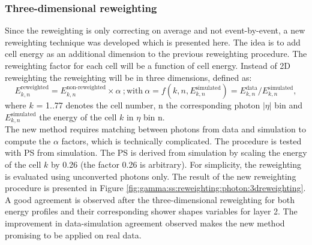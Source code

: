 \label{tab:avg}


\subsubsection{Three-dimensional reweighting}
Since the reweighting is only correcting on average and not event-by-event, a new reweighting technique was developed which is presented here. The idea is to add cell energy as an additional dimension to the previous reweighting procedure. The reweighting factor for each cell will be a function of cell energy. Instead of 2D reweighting the reweighting will be in three dimensions, defined as:
\begin{equation}
    E_{k,n}^{\text{reweighted}} = E_{k,n}^{\text{non-reweighted}} \times \alpha \ ; \text{with} \ \alpha = f(k,n,E_{k,n}^{\text{simulated}}) = E_{k,n}^{\text{data}}/E_{k,n}^{\text{simulated}},
\end{equation}
where $k$ = 1..77 denotes the cell number, n the corresponding photon $|\eta|$ bin and $E_{k,n}^{\text{simulated}}$  the energy of the cell $k$ in $\eta$ bin n. \\
The new method requires matching between photons from data and simulation to compute the $\alpha$ factors, which is technically complicated. The procedure is tested with PS from simulation. The PS is derived from simulation by scaling the energy of the cell $k$ by 0.26 (the factor 0.26 is arbitrary). For simplicity, the reweighting is evaluated using unconverted photons only.
The result of the new reweighting procedure is presented in Figure \ref{fig:gamma:ss:reweighting:photon:3dreweighting}. A good agreement is observed after the three-dimensional reweighting for both energy profiles and their corresponding shower shapes variables for layer 2. The improvement in data-simulation agreement observed makes the new method promising to be applied on real data.
